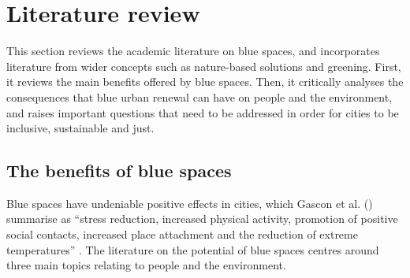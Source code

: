 \documentclass{article}
\begin{document}
\section{Literature review}



This section reviews the academic literature on blue spaces, and incorporates literature from wider concepts such as nature-based solutions and greening. First, it reviews the main benefits offered by blue spaces. Then, it critically analyses the consequences that blue urban renewal can have on people and the environment, and raises important questions that need to be addressed in order for cities to be inclusive, sustainable and just.

\subsection{The benefits of blue spaces}

Blue spaces have undeniable positive effects in cities, which Gascon et al. (\citeyear{gascon2017outdoor}) summarise as ``stress reduction, increased physical activity, promotion of positive social contacts, increased place attachment and the reduction of extreme temperatures'' \parencite{gascon2017outdoor}. The literature on the potential of blue spaces centres around three main topics relating to people and the environment.
\end{document}
